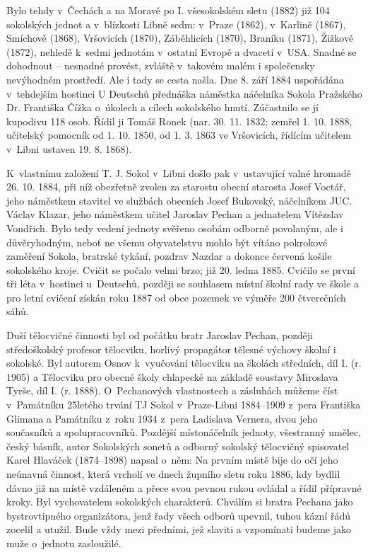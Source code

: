 \documentclass[11pt]{article}
\begin{document}
Bylo tehdy v~Čechách a na Moravě po I. všesokolském sletu (1882) již 104 sokolských jednot a v~blízkosti Libně sedm: v~Praze (1862), v~Karlině (1867), Smíchově (1868), Vršovicích (1870), Záběhlicích (1870), Braníku (1871), Žižkově (1872), nehledě k~sedmi jednotám v~ostatní Evropě a dvaceti v~USA. Snadné se dohodnout – nesnadné provést, zvláště v~takovém malém i společensky nevýhodném prostředí. Ale i tady se cesta našla. Dne 8. září 1884 uspořádána v~tehdejším hostinci \luv{}U Deutschů\ruv{} přednáška náměstka náčelníka Sokola Pražského Dr. Františka Čížka o~úkolech a cílech sokolského hnutí. Zúčastnilo se jí kupodivu 118 osob. Řídil ji Tomáš Ronek (nar. 30. 11. 1832; zemřel 1. 10. 1888, učitelský pomocník od 1. 10. 1850, od 1. 3. 1863 ve Vršovicích, řídícím učitelem v~Libni ustaven 19. 8. 1868). 

K~vlastnímu založení T. J. Sokol v~Libni došlo pak v~ustavující valné hromadě 26. 10. 1884, při níž obezřetně zvolen za starostu obecní starosta Josef Voctář, jeho náměstkem \luv{}stavitel ve službách obecních\ruv{} Josef Bukovský, náčelníkem JUC. Václav Klazar, jeho náměstkem učitel Jaroslav Pechan a jednatelem Vítězslav Vondřich. Bylo tedy vedení jednoty svěřeno osobám odborně povolaným, ale i důvěryhodným, neboť ne všemu obyvatelstvu mohlo být vítáno pokrokové zaměření Sokola, bratrské tykání, pozdrav \luv{}Nazdar\ruv{} a dokonce červená košile sokolského kroje. Cvičit se počalo velmi brzo; již 20. ledna 1885. Cvičilo se první tři léta v~hostinci u~Deutschů, později se souhlasem místní školní rady ve škole a pro letní cvičení získán roku 1887 od obce pozemek ve výměře 200 čtverečních sáhů.

Duší tělocvičné činnosti byl od počátku bratr Jaroslav Pechan, později středoškolský profesor tělocviku, horlivý propagátor tělesné výchovy školní i sokolské. Byl autorem \luv{}Osnov k~vyučování tělocviku na školách středních, díl I.\ruv{} (r. 1905) a \luv{}Tělocviku pro obecné školy chlapecké na základě soustavy Miroslava Tyrše, díl I.\ruv{} (r. 1888). O~Pechanových vlastnostech a zásluhách můžeme číst v~\luv{}Památníku 25letého trvání TJ Sokol v~Praze-Libni 1884–1909\ruv{} z~pera Františka Glimana a Památníku z~roku 1934 z~pera Ladislava Vernera, dvou jeho současníků a spolupracovníků. Pozdější místonáčelník jednoty, všestranný umělec, český básník, autor \luv{}Sokolských sonetů\ruv{} a odborný sokolský tělocvičný spisovatel Karel Hlaváček (1874–1898) napsal o~něm: \luv{}Na prvním místě bije do očí jeho neúnavná činnost, která vrcholí ve dnech župního sletu roku 1886, kdy bydlil dávno již na místě vzdáleném a přece svou pevnou rukou ovládal a řídil přípravné kroky. Byl vychovatelem sokolských charakterů. Chválím si bratra Pechana jako bystrovtipného organizátora, jenž řady všech odborů upevnil, tuhou kázní řádů zocelil a utužil. Bude vždy mezi předními, jež slaviti a vzpomínati budeme jako muže o~jednotu zasloužilé.\ruv{}
\end{document}

